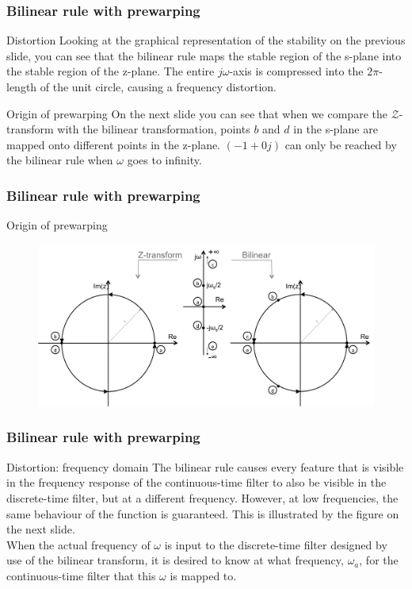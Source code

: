 \begin{frame}
	\frametitle{Bilinear rule with prewarping}
	\begin{alertblock}{Distortion}
		Looking at the graphical representation of the stability on the previous slide, you can see that the bilinear rule maps the stable region of the s-plane into the stable region of the z-plane. The entire $j\omega$-axis is compressed into the $2\pi$-length of the unit circle, causing a frequency distortion.
	\end{alertblock}
	\begin{block}{Origin of prewarping}
		On the next slide you can see that when we compare the $\mathcal{Z}$-transform with the bilinear transformation, points $b$ and $d$ in the s-plane are mapped onto different points in the z-plane. $(-1 + 0j)$ can only be reached by the bilinear rule when $\omega$ goes to infinity.
	\end{block}
\end{frame}

\begin{frame}
	\frametitle{Bilinear rule with prewarping}
	\begin{block}{Origin of prewarping}
		\begin{figure}
			\centering
			\includegraphics[width=1\linewidth]{Prewarp}
		\end{figure}
	\end{block}
\end{frame}

\begin{frame}
	\frametitle{Bilinear rule with prewarping}
	\begin{block}{Distortion: frequency domain}
		The bilinear rule causes every feature that is visible in the frequency response of the continuous-time filter to also be visible in the discrete-time filter, but at a different frequency. However, at low frequencies, the same behaviour of the function is guaranteed. This is illustrated by the figure on the next slide.\\
		\vspace{1em}
		When the actual frequency of $\omega$ is input to the discrete-time filter designed by use of the bilinear transform, it is desired to know at what frequency,  $\omega_a$, for the continuous-time filter that this  $\omega$ is mapped to.
	\end{block}
\end{frame}

